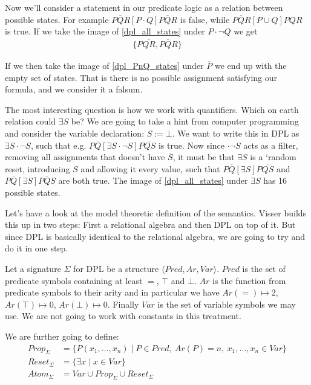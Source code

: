 \documentclass[12pt]{article}
\begin{document}
Now we'll consider a statement in our predicate logic as a relation between possible states. For example $P\overline{Q}R[P\cdot Q]P\overline{Q}R$ is false, while $P\overline{Q}R[P\cup Q]PQR$ is true. If we take the image of \eqref{dpl_all_states} under $P\cdot\neg Q$ we get
%
\begin{align}
\{P\overline{QR}, P\overline{Q}R\} \label{dpl_PnQ_states}
\end{align}

If we then take the image of \eqref{dpl_PnQ_states} under $\overline{P}$ we end up with the empty set of states. That is there is no possible assignment satisfying our formula, and we consider it a falsum.

The most interesting question is how we work with quantifiers. Which on earth relation could $\exists S$ be? We are going to take a hint from computer programming and consider the variable declaration: $S:=\bot$. We want to write this in DPL as $\exists S \cdot \neg S$, such that e.g. $P\overline{Q}[\exists S \cdot \neg S]P\overline{QS}$ is true. Now since $\cdot\neg S$ acts as a filter, removing all assignments that doesn't have $\overline{S}$, it must be that $\exists S$ is a `random reset, introducing $S$ and allowing it every value, such that $P\overline{Q}[\exists S]P\overline{QS}$ and $P\overline{Q}[\exists S]P\overline{Q}S$ are both true. The image of \eqref{dpl_all_states} under $\exists S$ has 16 possible states.

Let's have a look at the model theoretic definition of the semantics. Visser builds this up in two steps: First a relational algebra and then DPL on top of it. But since DPL is basically identical to the relational algebra, we are going to try and do it in one step.

Let a signature $\Sigma$ for DPL be a structure $\langle Pred, Ar, Var\rangle$. $Pred$ is the set of predicate symbols containing at least $=$, $\top$ and $\bot$. $Ar$ is the function from predicate symbols to their arity and in particular we have $Ar(=) \mapsto 2$, $Ar(\top) \mapsto 0$, $Ar(\bot) \mapsto 0$. Finally $Var$ is the set of variable symbols we may use. We are not going to work with constants in this treatment.

We are further going to define:
%
\begin{align}
Prop_\Sigma &= \{P(x_1,\dots,x_n) \mid P \in Pred,\ Ar(P)=n,\ x_1,\dots,x_n\in Var\}\\
Reset_\Sigma &= \{\exists x \mid x\in Var\}\\
Atom_\Sigma &= Var \cup Prop_\Sigma \cup Reset_\Sigma
\end{align}
\end{document}
